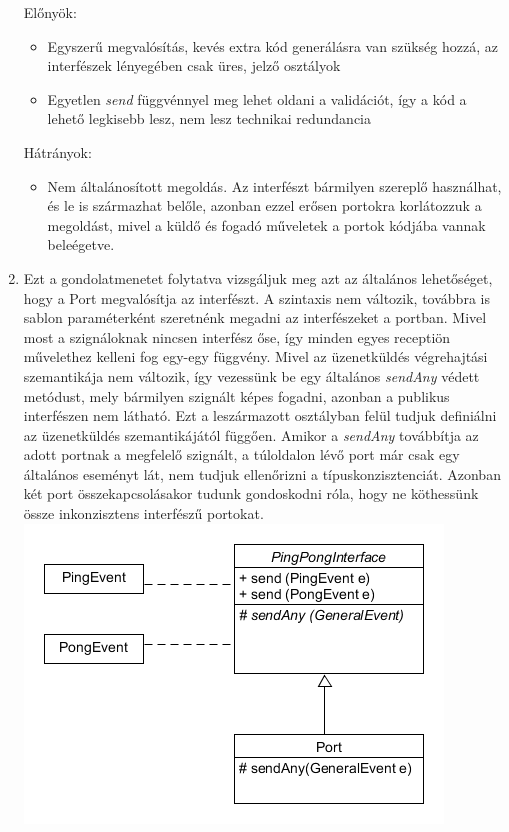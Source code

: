 \documentclass[a4paper,12pt]{report}
\begin{document}
\begin{enumerate}
Előnyök:
\begin{itemize}
\item Egyszerű megvalósítás, kevés extra kód generálásra van szükség hozzá, az interfészek lényegében csak üres, jelző osztályok
\item Egyetlen \textit{send} függvénnyel meg lehet oldani a validációt, így a kód a lehető legkisebb lesz, nem lesz technikai redundancia
\end{itemize}
Hátrányok:
\begin{itemize}
\item Nem általánosított megoldás. Az interfészt bármilyen szereplő használhat, és le is származhat belőle, azonban ezzel erősen portokra korlátozzuk a megoldást, mivel a küldő és fogadó műveletek a portok kódjába vannak beleégetve.
\end{itemize}
\item Ezt a gondolatmenetet folytatva vizsgáljuk meg azt az általános lehetőséget, hogy a Port megvalósítja az interfészt. A szintaxis nem változik, továbbra is sablon paraméterként szeretnénk megadni az interfészeket a portban. Mivel most a szignáloknak nincsen interfész őse, így minden egyes receptiön művelethez kelleni fog egy-egy függvény. Mivel az üzenetküldés végrehajtási szemantikája nem változik, így vezessünk be egy általános \textit{sendAny} védett metódust, mely bármilyen szignált képes fogadni, azonban a publikus interfészen nem látható. Ezt a leszármazott osztályban felül tudjuk definiálni az üzenetküldés szemantikájától függően. Amikor a \textit{sendAny} továbbítja az adott portnak a megfelelő szignált, a túloldalon lévő port már csak egy általános eseményt lát, nem tudjuk ellenőrizni a típuskonzisztenciát. Azonban két port összekapcsolásakor tudunk gondoskodni róla, hogy ne köthessünk össze inkonzisztens interfészű portokat. \\
\includegraphics[scale=0.7]{inf_ver2.png} \\

\end{enumerate}
\end{document}
